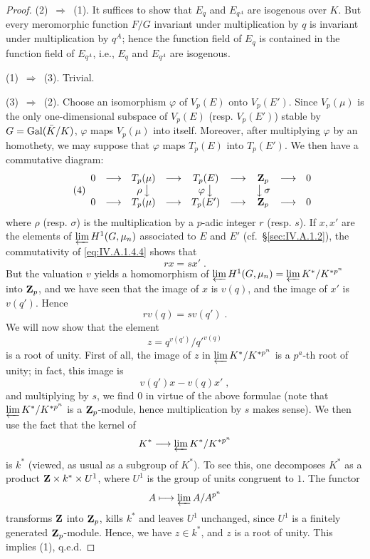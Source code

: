 \begin{proof}
(2)~$\Rightarrow$~(1). It suffices to show that $E_q$ and $E_{q^A}$ are
isogenous over $K$. But every meromorphic function $F/G$ invariant under
multiplication by $q$ is invariant under multiplication by $q^A$; hence
the function field of $E_q$ is contained in the function field of
$E_{q^A}$, i.e., $E_q$ and $E_{q^A}$ are isogenous.

(1)~$\Rightarrow$~(3). Trivial.

(3)~$\Rightarrow$~(2). Choose an isomorphism $\varphi$ of $V_p(E)$ onto
$V_p(E')$. Since $V_p(\mu)$ is the only one-dimensional subspace of
$V_p(E)$ (resp. $V_p(E')$) stable by $G=\mathrm{Gal}(\bar K/K)$, $\varphi$ maps
$V_p(\mu)$ into itself. Moreover, after multiplying $\varphi$ by an
homothety, we may suppose that $\varphi$ maps $T_p(E)$ into $T_p(E')$.
We then have a commutative diagram:
\begin{equation}
\tag{4}\label{eq:IV.A.1.4.4}
\begin{array}{ccccccccc}
0 &\longrightarrow& T_p(\mu) &\longrightarrow& T_p(E)
  &\longrightarrow& \mathbf{Z}_p &\longrightarrow& 0\\
& & \rho\,\big\downarrow & & \varphi\,\big\downarrow
  & & \big\downarrow\,\sigma & & \\
0 &\longrightarrow& T_p(\mu) &\longrightarrow& T_p(E')
  &\longrightarrow& \mathbf{Z}_p &\longrightarrow& 0
\end{array}
\end{equation}
where $\rho$ (resp. $\sigma$) is the multiplication by a $p$-adic
integer $r$ (resp. $s$). If $x, x'$ are the elements of
$\varprojlim H^1(G,\mu_n)$ associated to $E$ and $E'$
(cf.~\S\ref{sec:IV.A.1.2}), the commutativity of
\eqref{eq:IV.A.1.4.4} shows that
\[
rx = sx'\;.
\]
But the valuation $v$ yields a homomorphism of
$\varprojlim H^1(G,\mu_n)=\varprojlim K^*/K^{*p^n}$ into $\mathbf{Z}_p$, and we
have seen that the image of $x$ is $v(q)$, and the image of $x'$ is
$v(q')$. Hence
\[
rv(q) = sv(q')\;.
\]
We will now show that the element
\[
z = q^{v(q')}/q'^{v(q)}
\]
is a root of unity. First of all, the image of $z$ in
$\varprojlim K^*/K^{*p^n}$ is a $p^a$-th root of unity; in fact, this
image is
\[
v(q')x - v(q)x'\;,
\]
and multiplying by $s$, we find $0$ in virtue of the above formulae
(note that $\varprojlim K^*/K^{*p^n}$ is a $\mathbf{Z}_p$-module, hence
multiplication by $s$ makes sense). We then use the fact that the kernel
of
\[
K^* \longrightarrow \varprojlim K^*/K^{*p^n}
\]
is $k^*$ (viewed, as usual as a subgroup of $K^*$). To see this, one
decomposes $K^*$ as a product $\mathbf{Z}\times k^*\times U^1$, where $U^1$ is
the group of units congruent to $1$. The functor
\[
A \longmapsto \varprojlim A/A^{p^n}
\]
transforms $\mathbf{Z}$ into $\mathbf{Z}_p$, kills $k^*$ and leaves $U^1$ unchanged,
since $U^1$ is a finitely generated $\mathbf{Z}_p$-module. Hence, we have
$z\in k^*$, and $z$ is a root of unity. This implies (1), q.e.d.
\end{proof}

